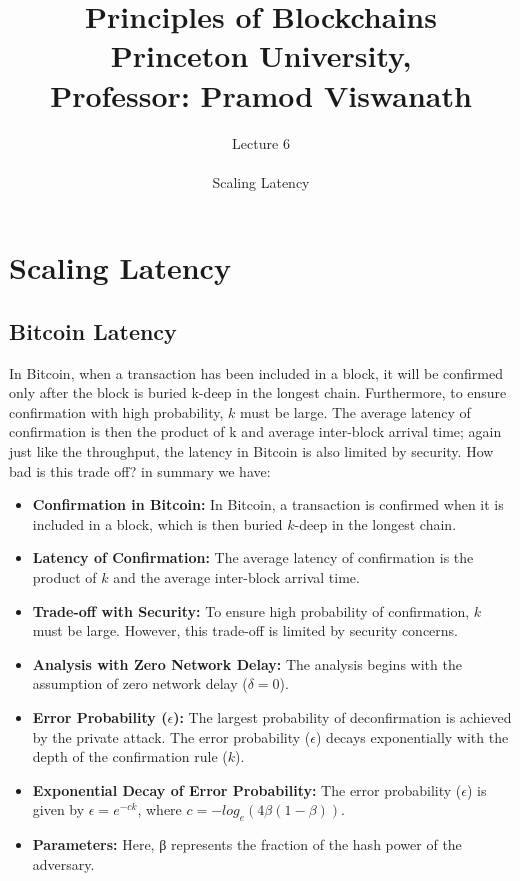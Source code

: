 \documentclass{report}
\title{\Huge{Principles of Blockchains \\ Princeton University,\\
		Professor: Pramod Viswanath}}
\author{\huge{Lecture 6} \\\\ Scaling Latency}
\begin{document}
\maketitle
\newpage%
\tableofcontents
\pagebreak

\chapter{Scaling Latency}

\section{Bitcoin Latency}
In Bitcoin, when a transaction has been included in a block, it will be confirmed only after the block is buried k-deep in the longest chain. Furthermore, to ensure confirmation with high probability, $k$ must be large. The average latency of confirmation is then the product of k and average inter-block arrival time; again just like the throughput, the latency in Bitcoin is also limited by security. How bad is this trade oﬀ? in summary we have:
\begin{itemize}
	\item \textbf{Confirmation in Bitcoin:} In Bitcoin, a transaction is confirmed when it is included in a block, which is then buried $k$-deep in the longest chain.
	\item \textbf{Latency of Confirmation:}  The average latency of confirmation is the product of $k$ and the average inter-block arrival time.
	\item \textbf{Trade-off with Security:} To ensure high probability of confirmation, $k$ must be large. However, this trade-off is limited by security concerns.
	\item \textbf{Analysis with Zero Network Delay:} The analysis begins with the assumption of zero network delay ($\delta = 0$).
	\item \textbf{Error Probability ($\epsilon$): }  The largest probability of deconfirmation is achieved by the private attack. The error probability ($\epsilon$) decays exponentially with the depth of the confirmation rule ($k$).
	\item  \textbf{Exponential Decay of Error Probability:} The error probability ($\epsilon$) is given by $\epsilon = e^{-ck}$, where $c = - log_{e}(4\beta(1 - \beta))$.
	\item \textbf{Parameters:} Here, β represents the fraction of the hash power of the adversary.
\end{itemize}
\end{document}

